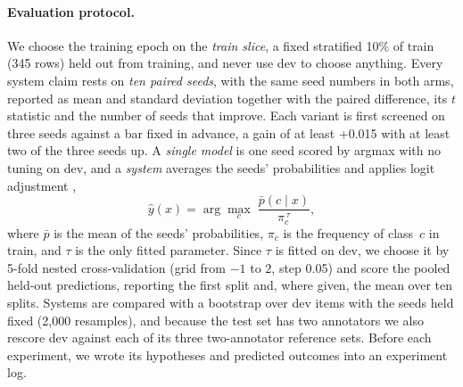 \paragraph{Evaluation protocol.}
We choose the training epoch on the \emph{train slice}, a fixed stratified 10\% of train (345 rows) held out from training, and never use dev to choose anything.
Every system claim rests on \emph{ten paired seeds}, with the same seed numbers in both arms, reported as mean and standard deviation together with the paired difference, its $t$ statistic and the number of seeds that improve.
Each variant is first screened on three seeds against a bar fixed in advance, a gain of at least +0.015 with at least two of the three seeds up.
A \emph{single model} is one seed scored by argmax with no tuning on dev, and a \emph{system} averages the seeds' probabilities and applies logit adjustment \citep{menon2021longtail},
\begin{equation}
  \hat{y}(x) = \arg\max_{c}\; \frac{\bar{p}(c \mid x)}{\pi_c^{\,\tau}},
  \label{eq:la}
\end{equation}
where $\bar{p}$ is the mean of the seeds' probabilities, $\pi_c$ is the frequency of class~$c$ in train, and $\tau$ is the only fitted parameter.
Since $\tau$ is fitted on dev, we choose it by 5-fold nested cross-validation (grid from $-1$ to $2$, step 0.05) and score the pooled held-out predictions, reporting the first split and, where given, the mean over ten splits.
Systems are compared with a bootstrap over dev items with the seeds held fixed (2,000 resamples), and because the test set has two annotators we also rescore dev against each of its three two-annotator reference sets.
Before each experiment, we wrote its hypotheses and predicted outcomes into an experiment log.
